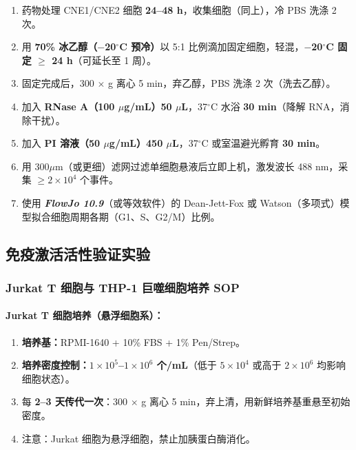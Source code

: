 \documentclass[12pt,a4paper,twoside]{article}
\newcommand{\software}[1]{\textbf{\textit{#1}}}
\begin{document}
\begin{enumerate}
  \item 药物处理 CNE1/CNE2 细胞 \textbf{24--48 h}，收集细胞（同上），冷 PBS 洗涤 2 次。
  \item 用 \textbf{70\% 冰乙醇（$-$20$^{\circ}$C 预冷）}以 5:1 比例滴加固定细胞，轻混，\textbf{$-$20$^{\circ}$C 固定 $\geq$ 24 h}（可延长至 1 周）。
  \item 固定完成后，300 $\times$ g 离心 5 min，弃乙醇，PBS 洗涤 2 次（洗去乙醇）。
  \item 加入 \textbf{RNase A（100 $\mu$g/mL）50 $\mu$L}，37$^{\circ}$C 水浴 \textbf{30 min}（降解 RNA，消除干扰）。
  \item 加入 \textbf{PI 溶液（50 $\mu$g/mL）450 $\mu$L}，37$^{\circ}$C 或室温避光孵育 \textbf{30 min}。
  \item 用 $300 \mu$m（或更细）滤网过滤单细胞悬液后立即上机，激发波长 488 nm，采集 $\geq 2 \times 10^4$ 个事件。
  \item 使用 \software{FlowJo 10.9}（或等效软件）的 Dean-Jett-Fox 或 Watson（多项式）模型拟合细胞周期各期（G1、S、G2/M）比例。
\end{enumerate}

\subsection{免疫激活活性验证实验}
\label{sec:module6_immune}

\subsubsection{Jurkat T 细胞与 THP-1 巨噬细胞培养 SOP}

\paragraph{Jurkat T 细胞培养（悬浮细胞系）：}

\begin{enumerate}
  \item \textbf{培养基：}RPMI-1640 + 10\% FBS + 1\% Pen/Strep。
  \item \textbf{培养密度控制：}\textbf{$1 \times 10^5$--$1 \times 10^6$ 个/mL}（低于 $5 \times 10^4$ 或高于 $2 \times 10^6$ 均影响细胞状态）。
  \item 每 \textbf{2--3 天传代一次}：300 $\times$ g 离心 5 min，弃上清，用新鲜培养基重悬至初始密度。
  \item 注意：Jurkat 细胞为悬浮细胞，禁止加胰蛋白酶消化。
\end{enumerate}
\end{document}
